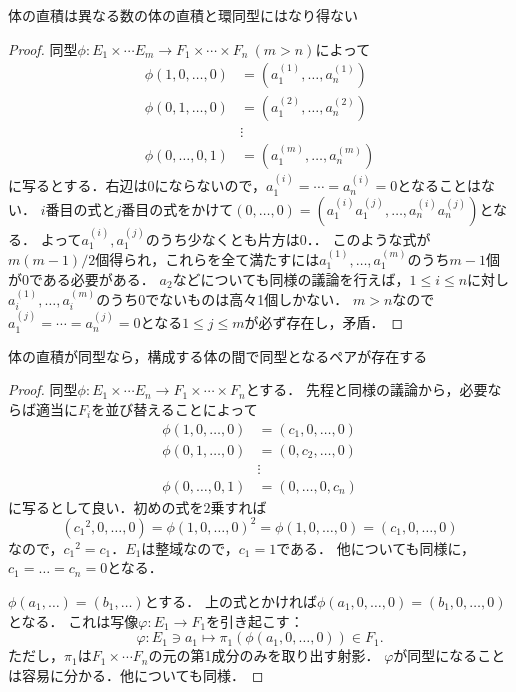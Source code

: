 \begin{screen}
  \begin{lem}
    \label{field_product_number}
    体の直積は異なる数の体の直積と環同型にはなり得ない
  \end{lem}
\end{screen}
\begin{proof}
  同型$\phi\colon E_1\times\cdots E_m\to F_1\times\cdots\times F_n\ (m>n)$によって
  \begin{align*}
    \phi(1, 0, \ldots, 0) & =  (a_1^{(1)}, \ldots, a_n^{(1)})\\
    \phi(0, 1, \ldots, 0) & =  (a_1^{(2)}, \ldots, a_n^{(2)})\\
                       &\vdots\\
    \phi(0, \ldots, 0, 1) & =  (a_1^{(m)}, \ldots, a_n^{(m)})
  \end{align*}
  に写るとする．右辺は$0$にならないので，$a_1^{(i)} = \cdots = a_n^{(i)} = 0$となることはない．
  $i$番目の式と$j$番目の式をかけて$(0, \ldots, 0) = (a_1^{(i)}a_1^{(j)}, \ldots, a_n^{(i)}a_n^{(j)})$となる．
  よって$a_1^{(i)}, a_1^{(j)}$のうち少なくとも片方は$0$．．
  このような式が$m(m-1)/2$個得られ，これらを全て満たすには$a_1^{(1)}, \ldots, a_1^{(m)}$のうち$m-1$個が$0$である必要がある．
  $a_2$などについても同様の議論を行えば，$1\leq i\leq n$に対し$a_i^{(1)}, \ldots, a_i^{(m)}$のうち$0$でないものは高々1個しかない．
  $m>n$なので$a_1^{(j)} = \cdots = a_n^{(j)} = 0$となる$1\leq j\leq m$が必ず存在し，矛盾．
\end{proof}

\begin{screen}
  \begin{lem}
    \label{field_product_iso}
    体の直積が同型なら，構成する体の間で同型となるペアが存在する
  \end{lem}
\end{screen}
\begin{proof}
  同型$\phi\colon E_1\times\cdots E_n\to F_1\times\cdots\times F_n$とする．
  先程と同様の議論から，必要ならば適当に$F_i$を並び替えることによって
  \begin{align*}
    \phi(1, 0, \ldots, 0) & =  (c_1, 0, \ldots, 0)\\
    \phi(0, 1, \ldots, 0) & =  (0, c_2, \ldots, 0)\\
                       &\vdots\\
    \phi(0, \ldots, 0, 1) & =  (0, \ldots, 0, c_n)
  \end{align*}
  に写るとして良い．初めの式を$2$乗すれば
  \[ (c_1{}^2, 0, \ldots, 0) = \phi(1, 0, \ldots, 0)^2 = \phi(1, 0, \ldots, 0) = (c_1, 0, \ldots, 0) \]
  なので，$c_1{}^2 = c_1$．$E_1$は整域なので，$c_1 = 1$である．
  他についても同様に，$c_1 = \ldots = c_n = 0$となる．

  $\phi(a_1, \ldots) = (b_1, \ldots)$とする．
  上の式とかければ$\phi(a_1, 0, \ldots, 0) = (b_1, 0, \ldots, 0)$となる．
  これは写像$\varphi\colon E_1\to F_1$を引き起こす：
  \[\varphi\colon E_1\ni a_1\mapsto \pi_1(\phi(a_1, 0, \ldots, 0))\in F_1.\]
  ただし，$\pi_1$は$F_1\times\cdots F_n$の元の第1成分のみを取り出す射影．
  $\varphi$が同型になることは容易に分かる．他についても同様．
\end{proof}


